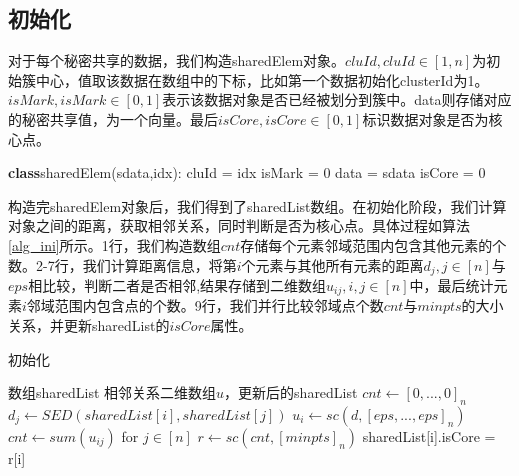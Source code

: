 \subsection{初始化}
对于每个秘密共享的数据，我们构造sharedElem对象。$ cluId, cluId \in [1, n]$为初始簇中心，值取该数据在数组中的下标，比如第一个数据初始化clusterId为1。$ isMark, isMark\in [0,1] $表示该数据对象是否已经被划分到簇中。data则存储对应的秘密共享值，为一个向量。最后$ isCore ,isCore\in[0,1]$标识数据对象是否为核心点。
\begin{algorithm}
	\begin{algorithmic}[1]
		\STATE \textbf{class}sharedElem(sdata,idx):
		\STATE \hspace{\algorithmicindent} cluId = idx
		\STATE \hspace{\algorithmicindent} isMark = 0
		\STATE \hspace{\algorithmicindent} data = sdata
		\STATE \hspace{\algorithmicindent} isCore = 0
	\end{algorithmic}
\end{algorithm}

构造完sharedElem对象后，我们得到了sharedList数组。在初始化阶段，我们计算对象之间的距离，获取相邻关系，同时判断是否为核心点。具体过程如算法\ref{alg_ini}所示。1行，我们构造数组$ cnt $存储每个元素邻域范围内包含其他元素的个数。2-7行，我们计算距离信息，将第$ i $个元素与其他所有元素的距离$ d_j,j\in[n] $与$ eps $相比较，判断二者是否相邻,结果存储到二维数组$ u_{ij},i,j\in[n] $中，最后统计元素$ i $邻域范围内包含点的个数。9行，我们并行比较邻域点个数$ cnt $与$ minpts $的大小关系，并更新sharedList的$ isCore $属性。
\begin{algorithm}[htbp]
	\renewcommand{\algorithmicrequire}{\textbf{输入:}}
	\renewcommand{\algorithmicensure}{\textbf{输出:}}
	\caption{初始化}
	\label{alg_ini}
	\begin{algorithmic}[1]
		\REQUIRE 数组sharedList
		\ENSURE 相邻关系二维数组$ u $，更新后的sharedList
		\STATE $ cnt \leftarrow [0,...,0]_n $
		\STATE $ d_{j} \leftarrow SED(sharedList[i], sharedList[j]) $
		\ENDFOR
		\STATE $ u_i \leftarrow sc(d, [eps,...,eps]_n) $
		\STATE $ cnt \leftarrow sum(u_{ij})$ for $j \in [n] $
		\ENDFOR
		\STATE $ r \leftarrow sc(cnt, [minpts]_n) $
		\STATE sharedList[i].isCore = r[i]
		\ENDFOR
	\end{algorithmic}
\end{algorithm}


